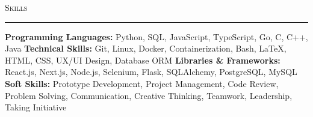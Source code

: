 \documentclass[11pt,letterpaper]{article}
\begin{document}
\vspace{4pt}
\textsc{\large{Skills}} 
\vspace{4pt}
\hrule
\begin{list}{}{\setlength{\leftmargin}{1em}\setlength{\rightmargin}{2pt}}
  
    \item
          \small{\textbf{Programming Languages:} Python, SQL, JavaScript, TypeScript, Go, C, C++, Java}
          \vspace{2pt} \newline
          \small{\textbf{Technical Skills:} Git, Linux, Docker, Containerization, Bash, LaTeX, HTML, CSS, UX/UI Design, Database ORM}
          \vspace{2pt} \newline
          \small{\textbf{Libraries \& Frameworks:} React.js, Next.js, Node.js, Selenium, Flask, SQLAlchemy, PostgreSQL, MySQL}
          \vspace{2pt} \newline
          \small{\textbf{Soft Skills:} Prototype Development, Project Management, Code Review, Problem Solving, Communication, Creative Thinking, Teamwork, Leadership, Taking Initiative}
          \vspace{0pt}
\end{list}
\end{document}
